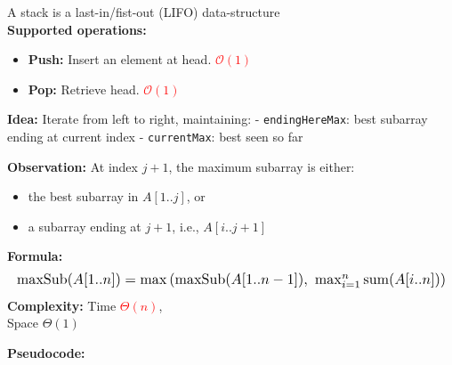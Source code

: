 \documentclass[a4paper,landscape]{article}
\newcommand{\timecomplexity}[1]{\textcolor{red}{#1}}
\newcommand{\bigo}{\mathcal{O}}
\begin{document}
\begin{multicols}{7}
\tcolorbox[mybox={Stack}]
A stack is a last-in/fist-out (LIFO) data-structure\\
\textbf{Supported operations:}
\begin{itemize}[noitemsep,itemsep=0pt]
    \item \textbf{Push:} Insert an element at head. \timecomplexity{\(\bigo(1)\)}
    \item \textbf{Pop:} Retrieve head. \timecomplexity{\(\bigo(1)\)}
\end{itemize}
\endtcolorbox

\tcolorbox[mybox={Maximum Subarray Problem (Kadane's Algorithm)}]
\textbf{Idea:}
Iterate from left to right, maintaining:
- \texttt{endingHereMax}: best subarray ending at current index
- \texttt{currentMax}: best seen so far

\textbf{Observation:}
At index \( j+1 \), the maximum subarray is either:
\begin{itemize}[noitemsep,itemsep=0pt]
    \item the best subarray in \( A[1..j] \), or
    \item a subarray ending at \( j+1 \), i.e., \( A[i..j+1] \)
\end{itemize}
\textbf{Formula:}
\[
\resizebox{1\textwidth}{!}{$
    \text{maxSub}(A[1..n]) = \max\left(
    \text{maxSub}(A[1..n-1]),\ 
    \max_{i=1}^{n} \text{sum}(A[i..n])
    \right)
$}
\]
\textbf{Complexity:} Time \timecomplexity{\( \Theta(n) \)}, \\Space \( \Theta(1) \)

\textbf{Pseudocode:}


\end{multicols}
\end{document}
